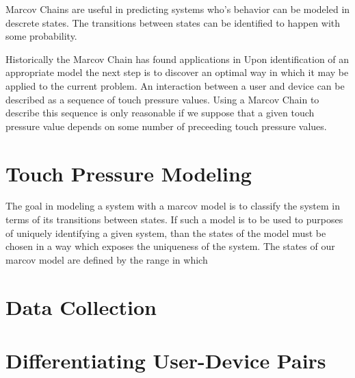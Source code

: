 \documentclass{acm_proc_article-sp}
\begin{document}
Marcov Chains are useful in predicting systems who's behavior can be modeled in descrete states. The transitions between states can be identified to happen with some probability.

Historically the Marcov Chain has found applications in
%
Upon identification of an appropriate model the next step is to discover an optimal way in which it may be applied to the current problem. An interaction between a user and device can be described as a sequence of touch pressure values. Using a Marcov Chain to describe this sequence is only reasonable if we suppose that a given touch pressure value depends on some number of preceeding touch pressure values. \cite{marcov_chains_previous_n_values}
%

\section{Touch Pressure Modeling}
%
The goal in modeling a system with a marcov model is to classify the system in terms of its transitions between states. If such a model is to be used to purposes of uniquely identifying a given system, than the states of the model must be chosen in a way which exposes the uniqueness of the system.
The states of our marcov model are defined by the range in which

\section{Data Collection}
\label{sec:differentiation}

\section{Differentiating User-Device Pairs}
\label{sec:differentiation}
\end{document}
